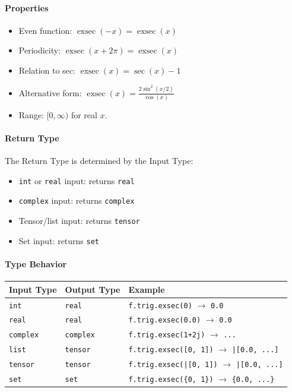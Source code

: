 \paragraph{Properties}
\begin{itemize}
\item Even function: $\operatorname{exsec}(-x) = \operatorname{exsec}(x)$
\item Periodicity: $\operatorname{exsec}(x + 2\pi) = \operatorname{exsec}(x)$
\item Relation to sec: $\operatorname{exsec}(x) = \sec(x) - 1$
\item Alternative form: $\operatorname{exsec}(x) = \frac{2\sin^2(x/2)}{\cos(x)}$
\item Range: $[0, \infty)$ for real $x$.
\end{itemize}

\paragraph{Return Type}
The Return Type is determined by the Input Type:
\begin{itemize}
\item \texttt{int} or \texttt{real} input: returns \texttt{real}
\item \texttt{complex} input: returns \texttt{complex}
\item Tensor/list input: returns \texttt{tensor}
\item Set input: returns \texttt{set}
\end{itemize}

\paragraph{Type Behavior}
\begin{center}
\begin{tabular}{lll}
\textbf{Input Type} & \textbf{Output Type} & \textbf{Example} \\ \hline
\texttt{int} & \texttt{real} & \texttt{f.trig.exsec(0)} $\to$ \texttt{0.0} \\
\texttt{real} & \texttt{real} & \texttt{f.trig.exsec(0.0)} $\to$ \texttt{0.0} \\
\texttt{complex} & \texttt{complex} & \texttt{f.trig.exsec(1+2j)} $\to$ \texttt{...} \\
\texttt{list} & \texttt{tensor} & \texttt{f.trig.exsec([0, 1])} $\to$ \texttt{|[0.0, ...]} \\
\texttt{tensor} & \texttt{tensor} & \texttt{f.trig.exsec(|[0, 1])} $\to$ \texttt{|[0.0, ...]} \\
\texttt{set} & \texttt{set} & \texttt{f.trig.exsec(\{0, 1\})} $\to$ \texttt{\{0.0, ...\}} \\
\end{tabular}
\end{center}

